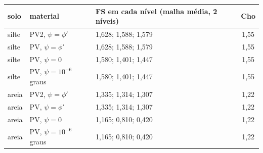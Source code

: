 \begin{tabular}{ll|l|c}
\toprule
solo & material & FS em cada nível (malha média, 2 níveis) & Cho\\
\midrule
silte & PV2, $\psi = \phi'$ & 1{,}628; 1{,}588; 1{,}579 & 1,55\\
silte & PV, $\psi = \phi'$ & 1{,}628; 1{,}588; 1{,}579 & 1,55\\
silte & PV, $\psi = 0$ & 1{,}580; 1{,}401; 1{,}447 & 1,55\\
silte & PV, $\psi = 10^{-6}$ graus & 1{,}580; 1{,}401; 1{,}447 & 1,55\\
areia & PV2, $\psi = \phi'$ & 1{,}335; 1{,}314; 1{,}307 & 1,22\\
areia & PV, $\psi = \phi'$ & 1{,}335; 1{,}314; 1{,}307 & 1,22\\
areia & PV, $\psi = 0$ & 1{,}165; 0{,}810; 0{,}420 & 1,22\\
areia & PV, $\psi = 10^{-6}$ graus & 1{,}165; 0{,}810; 0{,}420 & 1,22\\
\bottomrule
\end{tabular}
